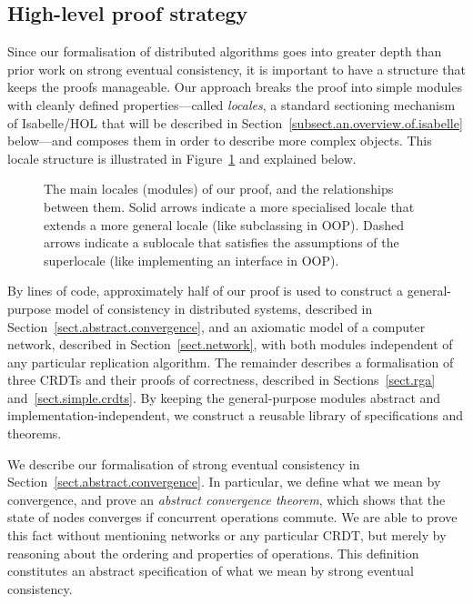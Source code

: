 \subsection{High-level proof strategy}
\label{sect.high-level.proof.strategy}

Since our formalisation of distributed algorithms goes into greater depth than prior work on strong eventual consistency, it is important to have a structure that keeps the proofs manageable.
Our approach breaks the proof into simple modules with cleanly defined properties---called \emph{locales}, a standard sectioning mechanism of Isabelle/HOL that will be described in Section~\ref{subsect.an.overview.of.isabelle} below---and composes them in order to describe more complex objects.
This locale structure is illustrated in Figure~\ref{fig.proof.structure} and explained below.

\begin{figure}
\centering

\caption{The main locales (modules) of our proof, and the relationships between them.
Solid arrows indicate a more specialised locale that extends a more general locale (like subclassing in OOP).
Dashed arrows indicate a sublocale that satisfies the assumptions of the superlocale (like implementing an interface in OOP).
}\label{fig.proof.structure}
\end{figure}

By lines of code, approximately half of our proof is used to construct a general-purpose model of consistency in distributed systems, described in Section~\ref{sect.abstract.convergence}, and an axiomatic model of a computer network, described in Section~\ref{sect.network}, with both modules independent of any particular replication algorithm.
The remainder describes a formalisation of three CRDTs and their proofs of correctness, described in Sections~\ref{sect.rga} and~\ref{sect.simple.crdts}.
By keeping the general-purpose modules abstract and implementation-independent, we construct a reusable library of specifications and theorems.

We describe our formalisation of strong eventual consistency in Section~\ref{sect.abstract.convergence}.
In particular, we define what we mean by convergence, and prove an \emph{abstract convergence theorem}, which shows that the state of nodes converges if concurrent operations commute.
We are able to prove this fact without mentioning networks or any particular CRDT, but merely by reasoning about the ordering and properties of operations.
This definition constitutes an abstract specification of what we mean by strong eventual consistency.

